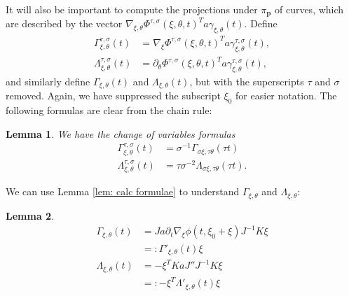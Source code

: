 \documentclass[12pt]{amsart}
\numberwithin{equation}{section}
\newtheorem{lemma}{Lemma}[section]
\newcommand{\1}{\mathbbm{1}}
\newcommand{\p}{\mathbf p}
\newcommand{\xixi}{\xi_0 + \xi}
\begin{document}
It will also be important to compute the projections under $\pi_\p$ of curves, which are described by the vector $\nabla_{\xi,\theta} \Phi^{\tau,\sigma}(\xi,\theta,t)^T a \gamma_{\xi,\theta}(t)$. Define 
\begin{align}
    \Gamma^{\tau,\sigma}_{\xi,\theta}(t) &= \nabla_{\xi} \Phi^{\tau, \sigma}(\xi,\theta,t)^T a \gamma_{\xi,\theta}^{\tau,\sigma}(t), \\
    \Lambda_{\xi, \theta}^{\tau, \sigma}(t) &= \partial_\theta \Phi^{\tau,\sigma}(\xi,\theta,t)^T a \gamma_{\xi,\theta}^{\tau,\sigma}(t),
\end{align}
and similarly define $\Gamma_{\xi,\theta}(t)$ and $\Lambda_{\xi,\theta}(t)$, but with the superscripts $\tau$ and $\sigma$ removed. 
Again, we have suppressed the subscript $\xi_0$ for easier notation. The following formulas are clear from the chain rule: 
\begin{lemma}\label{lem: Gamma Lambda change of vars formulas}
    We have the change of variables formulas 
    \begin{align}
        \Gamma_{\xi,\theta}^{\tau,\sigma}(t) &= \sigma^{-1} \Gamma_{\sigma\xi,\tau\theta}(\tau t) \\
        \Lambda_{\xi,\theta}^{\tau,\sigma}(t) &= \tau \sigma^{-2} \Lambda_{\sigma \xi, \tau \theta}(\tau t).
    \end{align} 
\end{lemma}
We can use Lemma \ref{lem: calc formulae} to understand $\Gamma_{\xi,\theta}$ and $\Lambda_{\xi,\theta}$:
\begin{lemma}\label{lem: Gamma Lambda formulas}
    \begin{align}
        \Gamma_{\xi,\theta}(t) &= Ja\partial_t\nabla_\xi \phi(t,\xixi) J^{-1}K \xi \\
        &=: \Gamma'_{\xi,\theta}(t) \xi \\
        \Lambda_{\xi,\theta}(t) &= -\xi^T K a J'' J^{-1} K \xi \\
        &=: -\xi^T \Lambda'_{\xi,\theta}(t) \xi
    \end{align}
\end{lemma}
\end{document}
